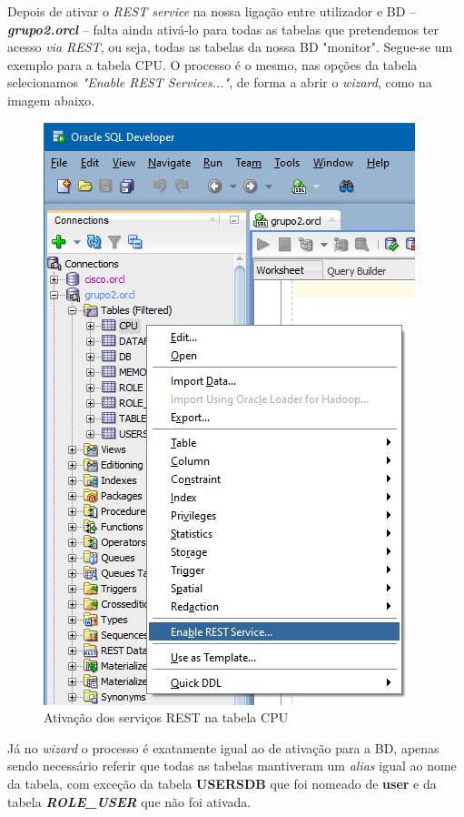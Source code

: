 \documentclass[a4paper]{article}
\begin{document}
Depois de ativar o \emph{REST service} na nossa ligação entre utilizador e BD -- \emph{\textbf{grupo2.orcl}}  --  falta ainda ativá-lo para todas as tabelas que pretendemos ter acesso \emph{via REST}, ou seja, todas as tabelas da nossa BD "monitor".
Segue-se um exemplo para a tabela CPU. O processo é o mesmo, nas opções da tabela selecionamos \emph{"Enable REST Services..."}, de forma a abrir o \emph{wizard}, como na imagem abaixo.

\begin{figure}[H]
\centering
\includegraphics[scale=0.6]{REST/rest_tabela_1.png}
\caption{Ativação dos serviços REST na tabela CPU}
\end{figure}

Já no \emph{wizard} o processo é exatamente igual ao de ativação para a BD, apenas sendo necessário referir que todas as tabelas mantiveram um \emph{alias} igual ao nome da tabela, com exceção da tabela \textbf{USERSDB} que foi nomeado de \textbf{user} e da tabela  \emph{\textbf{ROLE\_USER}} que não foi ativada.\\
\end{document}
